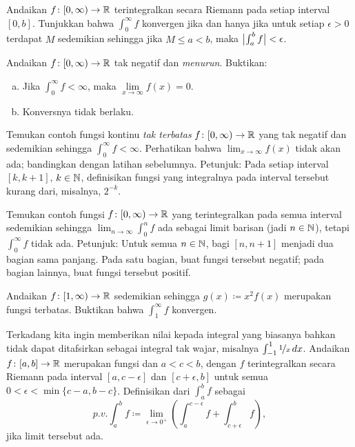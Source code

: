 \begin{exercise}
Andaikan $f \colon [0,\infty) \to {\mathbb{R}}$ terintegralkan secara Riemann pada setiap interval
$[0,b]$.  Tunjukkan bahwa $\int_0^\infty f$ konvergen jika dan hanya jika
untuk setiap $\epsilon > 0$ terdapat $M$ sedemikian sehingga jika $M \leq a < b$,
maka $\bigl\lvert {\int_a^b f} \bigr\rvert < \epsilon$.
\end{exercise}

\begin{exercise}
Andaikan $f \colon [0,\infty) \to {\mathbb{R}}$ tak negatif dan
\emph{menurun}.  Buktikan:
\begin{enumerate}[a)]
\item
Jika $\int_0^\infty f < \infty$, maka $\lim\limits_{x\to\infty} f(x) = 0$.
\item
Konversnya tidak berlaku.
\end{enumerate}
\end{exercise}

\begin{exercise}
Temukan contoh fungsi kontinu \emph{tak terbatas} $f \colon
[0,\infty) \to {\mathbb{R}}$ yang tak negatif dan sedemikian sehingga $\int_0^\infty f < \infty$.
Perhatikan bahwa $\lim_{x\to\infty} f(x)$ tidak akan ada; bandingkan dengan
latihan sebelumnya.
Petunjuk: Pada setiap interval $[k,k+1]$, $k \in {\mathbb{N}}$, definisikan fungsi yang
integralnya pada interval tersebut kurang dari, misalnya, $2^{-k}$.
\end{exercise}

\begin{exercise}
Temukan contoh fungsi $f \colon [0,\infty) \to {\mathbb{R}}$ yang terintegralkan pada semua
interval sedemikian sehingga $\lim_{n\to\infty} \int_0^n f$ ada sebagai
limit barisan (jadi $n \in {\mathbb{N}}$), tetapi
$\int_0^\infty f$ tidak ada.
Petunjuk: Untuk semua $n\in {\mathbb{N}}$, bagi $[n,n+1]$ menjadi dua bagian sama panjang.  Pada satu bagian,
buat fungsi tersebut negatif; pada bagian lainnya, buat fungsi tersebut positif.
\end{exercise}

\begin{exercise}
Andaikan $f \colon [1,\infty) \to {\mathbb{R}}$ sedemikian sehingga
$g(x) \coloneqq x^2 f(x)$ merupakan fungsi terbatas. Buktikan bahwa
$\int_1^\infty f$ konvergen.
\end{exercise}

\begin{exnote}
Terkadang kita ingin memberikan nilai kepada integral yang biasanya
bahkan tidak dapat ditafsirkan sebagai integral tak wajar,
misalnya $\int_{-1}^1 \nicefrac{1}{x}\,dx$.
Andaikan $f \colon [a,b] \to {\mathbb{R}}$ merupakan fungsi dan $a < c < b$,
dengan $f$ terintegralkan secara Riemann pada interval
$[a,c-\epsilon]$ dan $[c+\epsilon,b]$ untuk semua
$0 < \epsilon < \min\{c-a,b-c\}$.
Definisikan
\emph{} dari $\int_a^b f$ sebagai
\begin{equation*}
p.v.\!\int_a^b f \coloneqq \lim_{\epsilon\to 0^+}
\left(
\int_a^{c-\epsilon} f + 
\int_{c+\epsilon}^b f
\right) ,
\end{equation*}
jika limit tersebut ada.
\end{exnote}

